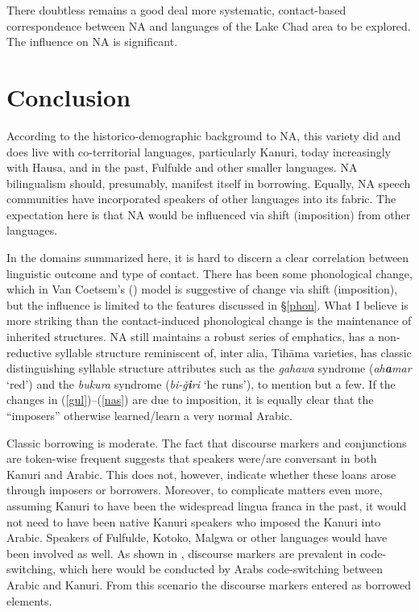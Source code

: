 \documentclass[output=paper]{langsci/langscibook}
\begin{document}
There doubtless remains a good deal more systematic, contact-based correspondence between NA and languages of the Lake Chad area to be explored. The influence on NA is significant.

\section{Conclusion
} \label{conc}

According to the historico-demographic background to NA, this variety did and does live with co-territorial languages, particularly Kanuri, today increasingly with Hausa, and in the past, Fulfulde and other smaller languages. NA bilingualism should, presumably, manifest itself in borrowing. Equally, NA speech communities have incorporated speakers of other languages into its fabric. The expectation here is that NA would be influenced via shift (imposition) from other languages.

In the domains summarized here, it is hard to discern a clear correlation between linguistic outcome and type of contact. There has been some phonological change, which in Van Coetsem’s (\citeyear{VanCoetsem1988,VanCoetsem2000}) model is suggestive of change via shift (imposition), but the influence is limited to the features discussed in §\ref{phon}. What I believe is more striking than the contact-induced phonological change is the maintenance of inherited structures. NA still maintains a robust series of emphatics, has a non-reductive syllable structure reminiscent of, inter alia, Tihāma varieties, has classic distinguishing syllable structure attributes such as the \textit{gahawa} syndrome (\textit{ah}\textbf{\textit{a}}\textit{mar} ‘red’) and the \textit{bukura} syndrome (\textit{bi-ǧ}\textbf{\textit{i}}\textit{ri} ‘he runs’), to mention but a few. If the changes in (\ref{gul})–(\ref{nas}) are due to imposition, it is equally clear that the “imposers” otherwise learned/learn a very normal Arabic. 

Classic borrowing is moderate. The fact that discourse markers and conjunctions are token-wise frequent suggests that speakers were/are conversant in both Kanuri and Arabic. This does not, however, indicate whether these loans arose through imposers or borrowers. Moreover, to complicate matters even more, assuming Kanuri to have been the widespread lingua franca in the past, it would not need to have been native Kanuri speakers who imposed the Kanuri into Arabic. Speakers of Fulfulde, Kotoko, Malgwa or other languages would have been involved as well. As shown in \citet{OwensHassan2010}, discourse markers are prevalent in code-switching, which here would be conducted by Arabs code-switching between Arabic and Kanuri. From this scenario the discourse markers entered as borrowed elements.
\end{document}
